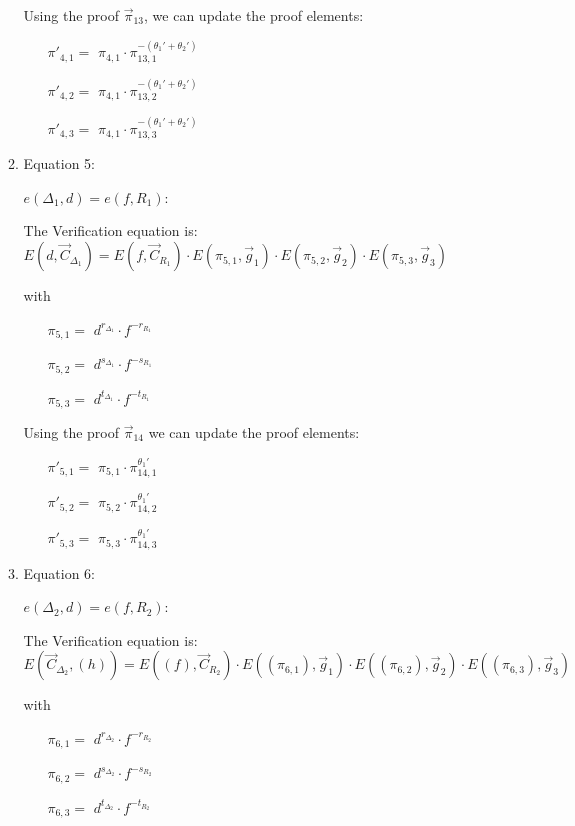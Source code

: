 \begin{description}
\begin{enumerate}
\begin{enumerate}
      Using the proof $\vec{\pi}_{13}$, we can update the proof elements:

      \begin{itemize}
      \item[$\pi'_{4,1} = $] $\pi_{4,1} \cdot \pi_{13,1}^{-(\theta_1' + \theta_2')}$
      \item[$\pi'_{4,2} = $] $\pi_{4,1} \cdot \pi_{13,2}^{-(\theta_1' + \theta_2')}$
      \item[$\pi'_{4,3} = $] $\pi_{4,1} \cdot \pi_{13,3}^{-(\theta_1' + \theta_2')}$
      \end{itemize}

    \item Equation 5:

      $e(\boxed{\Delta_1},d) = e(f, \boxed{R_1})$:
      
      The Verification equation is:  $E(d, \vec{C}_{\Delta_1}) = E(f, \vec{C}_{R_1}) \cdot E(\pi_{5,1}, \vec{g}_1)\cdot E(\pi_{5,2}, \vec{g}_2)\cdot E(\pi_{5,3}, \vec{g}_3)$
      
      with
      \begin{itemize}
      \item[$\pi_{5,1} = $] $d^{r_{\Delta_1}} \cdot f^{-r_{R_1}}$
      \item[$\pi_{5,2} = $] $d^{s_{\Delta_1}} \cdot f^{-s_{R_1}}$
      \item[$\pi_{5,3} = $] $d^{t_{\Delta_1}} \cdot f^{-t_{R_1}}$
      \end{itemize}

      Using the proof $\vec{\pi}_{14}$ we can update the proof elements:
      \begin{itemize}
      \item[$\pi'_{5,1} = $] $\pi_{5,1} \cdot \pi_{14,1}^{\theta_1'}$
      \item[$\pi'_{5,2} = $] $\pi_{5,2} \cdot \pi_{14,2}^{\theta_1'}$
      \item[$\pi'_{5,3} = $] $\pi_{5,3} \cdot \pi_{14,3}^{\theta_1'}$
      \end{itemize}

    \item Equation 6:

      $e(\boxed{\Delta_2},d) = e(f, \boxed{R_2})$:

      The Verification equation is:  $E(\vec{C}_{\Delta_2}, (h)) = E((f), \vec{C}_{R_2}) \cdot E((\pi_{6,1}), \vec{g}_1)\cdot E((\pi_{6,2}), \vec{g}_2)\cdot E((\pi_{6,3}), \vec{g}_3)$

      with
      \begin{itemize}
      \item[$\pi_{6,1} = $] $d^{r_{\Delta_2}} \cdot f^{-r_{R_2}}$
      \item[$\pi_{6,2} = $] $d^{s_{\Delta_2}} \cdot f^{-s_{R_2}}$
      \item[$\pi_{6,3} = $] $d^{t_{\Delta_2}} \cdot f^{-t_{R_2}}$
      \end{itemize}


\end{enumerate}
\end{enumerate}
\end{description}

